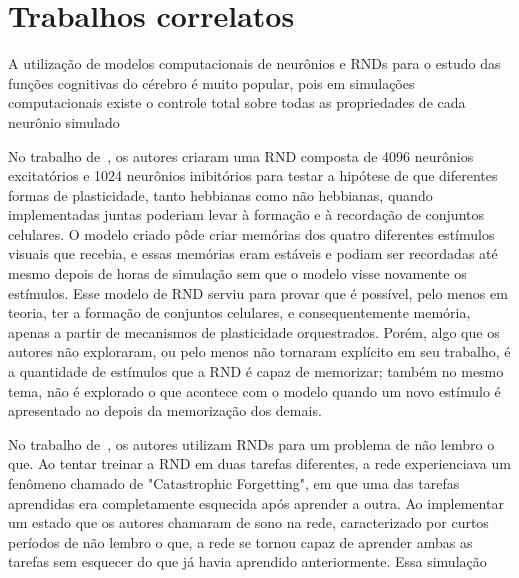\chapter{Trabalhos correlatos}






A utilização de modelos computacionais de neurônios e RNDs para o estudo das funções cognitivas do cérebro é muito popular, pois
em simulações computacionais existe o controle total sobre todas as propriedades de cada neurônio simulado


No trabalho de~\cite{zenkeDiverse2015}, os autores criaram uma RND composta de 4096 neurônios excitatórios e 1024 neurônios inibitórios para
testar a hipótese de que diferentes formas de plasticidade, tanto hebbianas como não hebbianas, quando implementadas juntas
poderiam levar à formação e à recordação de conjuntos celulares. O modelo criado pôde criar memórias dos quatro diferentes
estímulos visuais que recebia, e essas memórias eram estáveis e podiam ser recordadas até mesmo depois de horas de simulação sem
que o modelo visse novamente os estímulos. Esse modelo de RND serviu para provar que é possível, pelo menos em teoria, ter a
formação de conjuntos celulares, e consequentemente memória, apenas a partir de mecanismos de plasticidade orquestrados. Porém,
algo que os autores não exploraram, ou pelo menos não tornaram explícito em seu trabalho, é a quantidade de estímulos que a RND é
capaz de memorizar; também no mesmo tema, não é explorado o que acontece com o modelo quando um novo estímulo é apresentado ao
depois da memorização dos demais.


No trabalho de~\cite{goldenSleep2022}, os autores utilizam RNDs para um problema de não lembro o que. Ao tentar treinar a RND em duas
tarefas diferentes, a rede experienciava um fenômeno chamado de "Catastrophic Forgetting", em que uma das tarefas aprendidas era
completamente esquecida após aprender a outra. Ao implementar um estado que os autores chamaram de sono na rede, caracterizado por
curtos períodos de não lembro o que, a rede se tornou capaz de aprender ambas as tarefas sem esquecer do que já havia aprendido
anteriormente. Essa simulação


